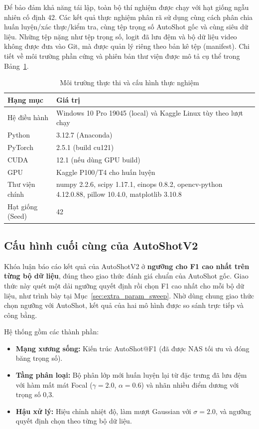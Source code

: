 Để bảo đảm khả năng tái lập, toàn bộ thí nghiệm được chạy với hạt giống ngẫu nhiên cố định 42. Các kết quả thực nghiệm phân rã sử dụng cùng cách phân chia huấn luyện/xác thực/kiểm tra, cùng tệp trọng số AutoShot gốc và cùng siêu dữ liệu. Những tệp nặng như tệp trọng số, logit đã lưu đệm và bộ dữ liệu video không được đưa vào Git, mà được quản lý riêng theo bản kê tệp (manifest). Chi tiết về môi trường phần cứng và phiên bản thư viện được mô tả cụ thể trong Bảng~\ref{tab:execution_environment}.

\begin{table}[H]
\centering
\small
\caption{Môi trường thực thi và cấu hình thực nghiệm}
\label{tab:execution_environment}
\begin{tabularx}{\textwidth}{lX}
\toprule
\textbf{Hạng mục} & \textbf{Giá trị} \\
\midrule
Hệ điều hành & Windows 10 Pro 19045 (local) và Kaggle Linux tùy theo lượt chạy \\
Python & 3.12.7 (Anaconda) \\
PyTorch & 2.5.1 (build cu121) \\
CUDA & 12.1 (nếu dùng GPU build) \\
GPU & Kaggle P100/T4 cho huấn luyện \\
Thư viện chính & numpy 2.2.6, scipy 1.17.1, einops 0.8.2, opencv-python 4.12.0.88, pillow 10.4.0, matplotlib 3.10.8 \\
Hạt giống (Seed) & 42 \\
\bottomrule
\end{tabularx}
\end{table}

\subsection{Cấu hình cuối cùng của AutoShotV2}
Khóa luận báo cáo kết quả của AutoShotV2 ở \textbf{ngưỡng cho F1 cao nhất trên từng bộ dữ liệu}, đúng theo giao thức đánh giá chuẩn của AutoShot gốc. Giao thức này quét một dải ngưỡng quyết định rồi chọn F1 cao nhất cho mỗi bộ dữ liệu, như trình bày tại Mục~\ref{sec:extra_param_sweep}. Nhờ dùng chung giao thức chọn ngưỡng với AutoShot, kết quả của hai mô hình được so sánh trực tiếp và công bằng.

Hệ thống gồm các thành phần:
\begin{itemize}
    \item \textbf{Mạng xương sống:} Kiến trúc AutoShot@F1 (đã được NAS tối ưu và đóng băng trọng số).
    \item \textbf{Tầng phân loại:} Bộ phân lớp mới huấn luyện lại từ đặc trưng đã lưu đệm với hàm mất mát Focal ($\gamma=2.0$, $\alpha=0.6$) và nhãn nhiều điểm dương với trọng số 0,3.
    \item \textbf{Hậu xử lý:} Hiệu chỉnh nhiệt độ, làm mượt Gaussian với $\sigma=2.0$, và ngưỡng quyết định chọn theo từng bộ dữ liệu.
\end{itemize}

